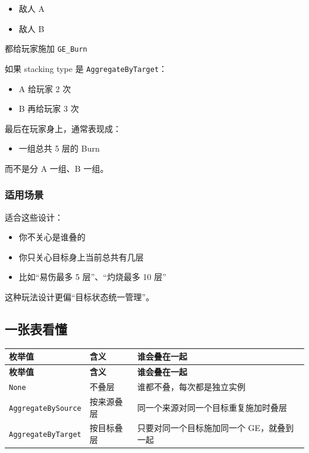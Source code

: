 \begin{itemize}
	\item 敌人 A
	\item 敌人 B
\end{itemize}

都给玩家施加 \texttt{GE\_Burn}

如果 stacking type 是 \texttt{AggregateByTarget}：

\begin{itemize}
	\item A 给玩家 2 次
	\item B 再给玩家 3 次
\end{itemize}

最后在玩家身上，通常表现成：

\begin{itemize}
	\item 一组总共 5 层的 Burn
\end{itemize}

而不是分 A 一组、B 一组。

\subsubsection*{适用场景}
适合这些设计：

\begin{itemize}
	\item 你不关心是谁叠的
	\item 你只关心目标身上当前总共有几层
	\item 比如“易伤最多 5 层”、“灼烧最多 10 层”
\end{itemize}

这种玩法设计更偏“目标状态统一管理”。

\subsection{一张表看懂}

\begin{longtable}{|p{}|p{}|p{}|}
	\hline
	\textbf{枚举值} & \textbf{含义} & \textbf{谁会叠在一起} \\
	\hline
	\endfirsthead
	
	\hline
	\textbf{枚举值} & \textbf{含义} & \textbf{谁会叠在一起} \\
	\hline
	\endhead
	
	\hline
	\endfoot
	
	\hline
	\endlastfoot
	
	\texttt{None} & 不叠层 & 谁都不叠，每次都是独立实例 \\
	\hline
	\texttt{AggregateBySource} & 按来源叠层 & 同一个来源对同一个目标重复施加时叠层 \\
	\hline
	\texttt{AggregateByTarget} & 按目标叠层 & 只要对同一个目标施加同一个 GE，就叠到一起 \\
	\hline
\end{longtable}

